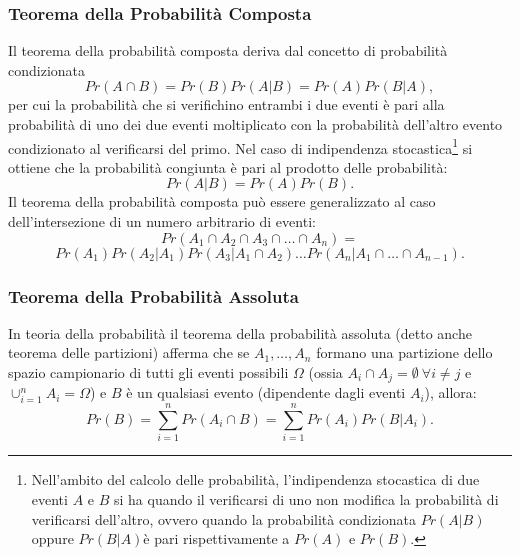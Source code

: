 \documentclass[12pt,oneside,openany]{memoir}
\numberwithin{equation}{subsection}
\begin{document}
\subsubsection{Teorema della Probabilit\`a Composta}
Il teorema della probabilit\`a composta deriva dal concetto di probabilit\`a
condizionata
\begin{equation}
    Pr(A \cap B) = Pr(B) Pr(A|B) = Pr(A) Pr(B|A),
\end{equation}
per cui la probabilit\`a che si verifichino entrambi i due eventi \`e pari alla
probabilit\`a di uno dei due eventi moltiplicato con la probabilit\`a dell'altro
evento condizionato al verificarsi del primo.
\bigbreak\noindent
Nel caso di indipendenza stocastica\footnote{Nell'ambito del calcolo delle
probabilit\`a, l'indipendenza stocastica di due eventi $A$ e $B$ si ha quando il
verificarsi di uno non modifica la probabilit\`a di verificarsi dell'altro,
ovvero quando la probabilit\`a condizionata $Pr(A | B)$ oppure $Pr(B | A)$\`e
pari rispettivamente a $Pr(A)$ e $Pr(B)$.} si ottiene che la probabilit\`a
congiunta \`e pari al prodotto delle probabilit\`a:
\begin{equation}
    Pr(A|B) = Pr(A) Pr(B).
\end{equation}
\bigbreak\noindent
Il teorema della probabilit\`a composta può essere generalizzato al caso
dell'intersezione di un numero arbitrario di eventi:
\begin{equation}
    Pr(A_1 \cap A_2 \cap A_3 \cap \dots \cap A_n) =
\end{equation}
\[
    Pr(A_1) Pr(A_2 | A_1) Pr(A_3 | A_1 \cap A_2) \dots Pr(A_n | A_1 \cap \dots
    \cap A_{n-1}).
\]

%


\subsubsection{Teorema della Probabilit\`a Assoluta}
In teoria della probabilit\`a il teorema della probabilit\`a assoluta (detto 
anche teorema delle partizioni) afferma che se $A_1, \dots, A_n$ formano una
partizione dello spazio campionario di tutti gli eventi possibili $\Omega$
(ossia $A_i \cap A_j = \emptyset \ \forall i \neq j$ e $\cup_{i = 1}^{n} A_i =
\Omega$) e $B$ \`e un qualsiasi evento (dipendente dagli eventi $A_i$), allora:
\begin{equation}
    Pr(B) = \sum_{i = 1}^{n} Pr(A_i \cap B) = \sum_{i = 1}^{n} Pr(A_i)
    Pr(B | A_i).
\end{equation}
\end{document}
